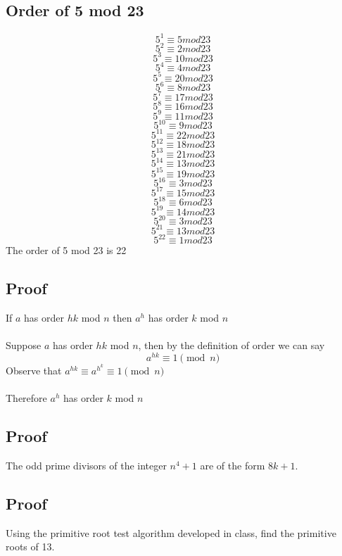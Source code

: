 \documentclass{article}
\begin{document}
\subsection{Order of 5 mod 23}
$$5^1 \equiv 5 mod 23$$
$$5^2 \equiv 2 mod 23$$
$$5^3 \equiv 10 mod 23$$
$$5^4 \equiv 4 mod 23$$
$$5^5 \equiv 20 mod 23$$
$$5^6 \equiv 8 mod 23$$
$$5^7 \equiv 17 mod 23$$
$$5^8 \equiv 16 mod 23$$
$$5^9 \equiv 11 mod 23$$
$$5^10 \equiv 9 mod 23$$
$$5^11 \equiv 22 mod 23$$
$$5^12 \equiv 18 mod 23$$
$$5^13 \equiv 21 mod 23$$
$$5^14 \equiv 13 mod 23$$
$$5^15 \equiv 19 mod 23$$
$$5^16 \equiv 3 mod 23$$
$$5^17 \equiv 15 mod 23$$
$$5^18 \equiv 6 mod 23$$
$$5^19 \equiv 14 mod 23$$
$$5^20 \equiv 3 mod 23$$
$$5^21 \equiv 13 mod 23$$
$$5^22 \equiv 1 mod 23$$
The order of 5 mod 23 is 22

\subsection{Proof}
If $a$ has order $hk$ mod $n$ then $a^{h}$ has order $k$ mod $n$
\\\\
Suppose $a$ has order $hk$ mod $n$, then by the definition of order we can say
$$a^{hk} \equiv 1 \pmod{n}$$
Observe that $a^{hk} \equiv a^{h^{k}} \equiv 1 \pmod{n}$
\\\\
Therefore $a^{h}$ has order $k$ mod $n$

\subsection{Proof}
The odd prime divisors of the integer $n^4 +1$ are of the form $8k + 1$.  

\subsection{Proof}
Using the primitive root test algorithm developed in class, find the primitive roots of 13.
\end{document}
